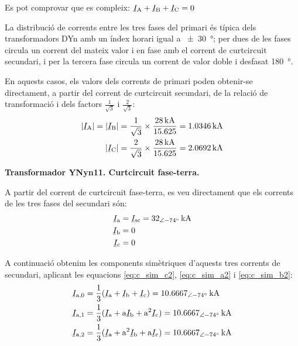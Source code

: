 \begin{exemple}
    Es pot comprovar que es compleix: $\cmplx{I}\ped{A} + \cmplx{I}\ped{B} + \cmplx{I}\ped{C} = 0$

    La distribució de corrents entre les tres fases del primari és típica dels transformadors DYn amb un índex horari igual a \qty{+-30}{\degree}; per dues de les fases circula un corrent del mateix valor i en fase amb el corrent de curtcircuit secundari, i per la tercera fase circula un corrent de valor doble i desfasat \qty{180}{\degree}.

    En aquests casos, els valors dels corrents de primari poden obtenir-se directament, a partir del corrent de curtcircuit secundari, de la relació de transformació i dels factors $\frac{1}{\sqrt{3}}$ i  $\frac{2}{\sqrt{3}}$:
    \begin{align*}
        |\cmplx{I}\ped{A}| = |\cmplx{I}\ped{B}| = \frac{1}{\sqrt{3}} \times \frac{\qty{28}{kA}}{\num{15,625}} = \qty{1,0346}{kA} \\
        |\cmplx{I}\ped{C}|= \frac{2}{\sqrt{3}} \times \frac{\qty{28}{kA}}{\num{15,625}} = \qty{2,0692}{kA}
    \end{align*}

    \break
    \textbf{ Transformador YNyn11. Curtcircuit fase-terra.}

    \begin{center}
       
    \end{center}

    A partir del corrent de curtcircuit fase-terra, es veu directament que els corrents de les tres fases del secundari són:
    \begin{align*}
        \cmplx{I}\ped{a} &= \cmplx{I}\ped{sc} = \qtypd{32}{-74}{kA} \\
        \cmplx{I}\ped{b} &= 0  \\
        \cmplx{I}\ped{c} &= 0
    \end{align*}

    A continuació obtenim les components simètriques d'aquests tres corrents de secundari, aplicant les equacions \eqref{eq:c_sim_c2}, \eqref{eq:c_sim_a2} i \eqref{eq:c_sim_b2}:
    \begin{align*}
        \cmplx{I}\ped{a,0} &= \frac{1}{3} (\cmplx{I}\ped{a} + \cmplx{I}\ped{b} +
        \cmplx{I}\ped{c}) = \qtypd{10,6667}{-74}{kA} \\
        \cmplx{I}\ped{a,1} &= \frac{1}{3} (\cmplx{I}\ped{a} + \au \cmplx{I}\ped{b} +
         \au^2 \cmplx{I}\ped{c}) = \qtypd{10,6667}{-74}{kA}  \\
        \cmplx{I}\ped{a,2} &= \frac{1}{3} (\cmplx{I}\ped{a} + \au^2 \cmplx{I}\ped{b} +
         \au \cmplx{I}\ped{c}) = \qtypd{10,6667}{-74}{kA}
    \end{align*}


\end{exemple}
